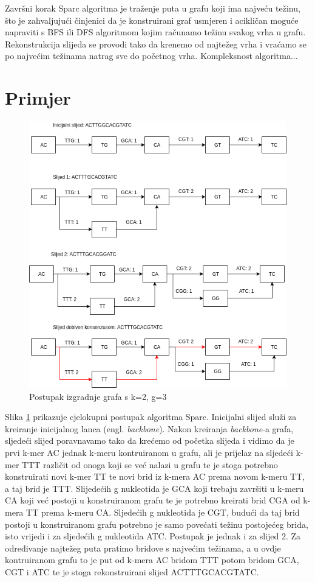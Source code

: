\documentclass[times, utf8, seminar, numeric]{fer}
\begin{document}
Završni korak Sparc algoritma je traženje puta u grafu koji ima najveću težinu, što je zahvaljujući činjenici da je konstruirani graf usmjeren i acikličan moguće napraviti s BFS ili DFS algoritmom kojim računamo težinu svakog vrha u grafu. Rekonstrukcija slijeda se provodi tako da krenemo od najtežeg vrha i vraćamo se po najvećim težinama natrag sve do početnog vrha. Kompleksnost algoritma...

\section{Primjer}
\begin{figure}[htb]
	\centering
	\includegraphics[scale=0.6]{images/backbone.png}
	\caption{Postupak izgradnje grafa s k=2, g=3}
	\label{picture:example}
\end{figure}

Slika \ref{picture:example} prikazuje cjelokupni postupak algoritma Sparc. Inicijalni slijed služi za kreiranje inicijalnog lanca (engl. \emph{backbone}). Nakon kreiranja \emph{backbone}-a grafa, sljedeći slijed poravnavamo tako da krećemo od početka slijeda i vidimo da je prvi k-mer AC jednak k-meru kontruiranom u grafu, ali je prijelaz na sljedeći k-mer TTT različit od onoga koji se već nalazi u grafu te je stoga potrebno konstruirati novi k-mer TT te novi brid iz k-mera AC prema novom k-meru TT, a taj brid je TTT. Slijedećih g nukleotida je GCA koji trebaju završiti u k-meru CA koji već postoji u konstruiranom grafu te je potrebno kreirati brid CGA od k-mera TT prema k-meru CA. Sljedećih g nukleotida je CGT, budući da taj brid postoji u konstruiranom grafu potrebno je samo povećati težinu postojećeg brida, isto vrijedi i za sljedećih g nukleotida ATC. Postupak je jednak i za slijed 2. Za određivanje najtežeg puta pratimo bridove s najvećim težinama, a u ovdje kontruiranom grafu to je put od k-mera AC bridom TTT potom bridom GCA, CGT i ATC te je stoga rekonstruirani slijed ACTTTGCACGTATC.
\end{document}
